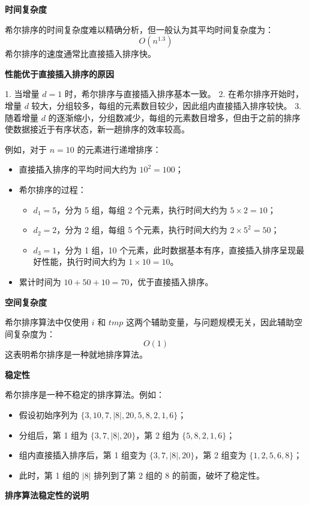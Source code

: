 \documentclass[lang=cn,newtx,10pt,scheme=chinese]{elegantbook}
\begin{document}
\textbf{时间复杂度}  

希尔排序的时间复杂度难以精确分析，但一般认为其平均时间复杂度为：
\[
O(n^{1.3})
\]
希尔排序的速度通常比直接插入排序快。


\textbf{性能优于直接插入排序的原因}

1. 当增量 $d = 1$ 时，希尔排序与直接插入排序基本一致。
2. 在希尔排序开始时，增量 $d$ 较大，分组较多，每组的元素数目较少，因此组内直接插入排序较快。
3. 随着增量 $d$ 的逐渐缩小，分组数减少，每组的元素数目增多，但由于之前的排序使数据接近于有序状态，新一趟排序的效率较高。

例如，对于 $n = 10$ 的元素进行递增排序：
\begin{itemize}
  \item 直接插入排序的平均时间大约为 $10^2 = 100$；
  \item 希尔排序的过程：
    \begin{itemize}
      \item $d_1 = 5$，分为 5 组，每组 2 个元素，执行时间大约为 $5 \times 2 = 10$；
      \item $d_2 = 2$，分为 2 组，每组 5 个元素，执行时间大约为 $2 \times 5^2 = 50$；
      \item $d_3 = 1$，分为 1 组，10 个元素，此时数据基本有序，直接插入排序呈现最好性能，执行时间大约为 $1 \times 10 = 10$。
    \end{itemize}
  \item 累计时间为 $10 + 50 + 10 = 70$，优于直接插入排序。
\end{itemize}


\textbf{空间复杂度}  

希尔排序算法中仅使用 $i$ 和 $tmp$ 这两个辅助变量，与问题规模无关，因此辅助空间复杂度为：
\[
O(1)
\]
这表明希尔排序是一种就地排序算法。


\textbf{稳定性}  

希尔排序是一种不稳定的排序算法。例如：
\begin{itemize}
  \item 假设初始序列为 $\{3, 10, 7, |8|, 20, 5, 8, 2, 1, 6\}$；
  \item 分组后，第 1 组为 $\{3, 7, |8|, 20\}$，第 2 组为 $\{5, 8, 2, 1, 6\}$；
  \item 组内直接插入排序后，第 1 组变为 $\{3, 7, |8|, 20\}$，第 2 组变为 $\{1, 2, 5, 6, 8\}$；
  \item 此时，第 1 组的 $|8|$ 排列到了第 2 组的 $8$ 的前面，破坏了稳定性。
\end{itemize}


\textbf{排序算法稳定性的说明}
\end{document}
